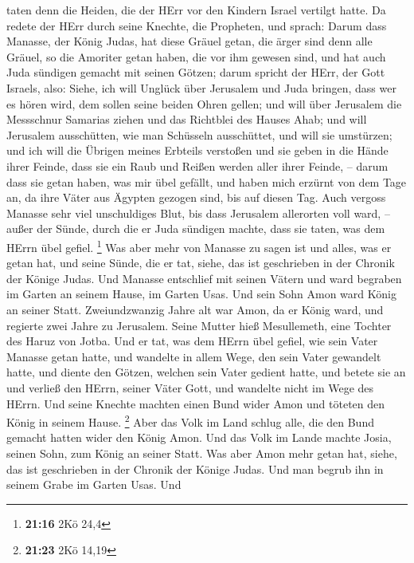 taten denn die Heiden, die der HErr vor den Kindern Israel vertilgt
hatte.  Da redete der HErr durch seine Knechte, die
Propheten, und sprach:  Darum dass Manasse, der König
Judas, hat diese Gräuel getan, die ärger sind denn alle Gräuel, so die
Amoriter getan haben, die vor ihm gewesen sind, und hat auch Juda
sündigen gemacht mit seinen Götzen;  darum spricht der
HErr, der Gott Israels, also: Siehe, ich will Unglück über Jerusalem und
Juda bringen, dass wer es hören wird, dem sollen seine beiden Ohren
gellen;  und will über Jerusalem die Messschnur Samarias
ziehen und das Richtblei des Hauses Ahab; und will Jerusalem
ausschütten, wie man Schüsseln ausschüttet, und will sie umstürzen;
 und ich will die Übrigen meines Erbteils verstoßen und sie
geben in die Hände ihrer Feinde, dass sie ein Raub und Reißen werden
aller ihrer Feinde, --  darum dass sie getan haben, was mir
übel gefällt, und haben mich erzürnt von dem Tage an, da ihre Väter aus
Ägypten gezogen sind, bis auf diesen Tag.  Auch vergoss
Manasse sehr viel unschuldiges Blut, bis dass Jerusalem allerorten voll
ward, -- außer der Sünde, durch die er Juda sündigen machte, dass sie
taten, was dem HErrn übel gefiel. \footnote{\textbf{21:16} 2Kö 24,4}
 Was aber mehr von Manasse zu sagen ist und alles, was er
getan hat, und seine Sünde, die er tat, siehe, das ist geschrieben in
der Chronik der Könige Judas.  Und Manasse entschlief mit
seinen Vätern und ward begraben im Garten an seinem Hause, im Garten
Usas. Und sein Sohn Amon ward König an seiner Statt. 
Zweiundzwanzig Jahre alt war Amon, da er König ward, und regierte zwei
Jahre zu Jerusalem. Seine Mutter hieß Mesullemeth, eine Tochter des
Haruz von Jotba.  Und er tat, was dem HErrn übel gefiel,
wie sein Vater Manasse getan hatte,  und wandelte in allem
Wege, den sein Vater gewandelt hatte, und diente den Götzen, welchen
sein Vater gedient hatte, und betete sie an  und verließ
den HErrn, seiner Väter Gott, und wandelte nicht im Wege des HErrn.
 Und seine Knechte machten einen Bund wider Amon und
töteten den König in seinem Hause. \footnote{\textbf{21:23} 2Kö 14,19}
 Aber das Volk im Land schlug alle, die den Bund gemacht
hatten wider den König Amon. Und das Volk im Lande machte Josia, seinen
Sohn, zum König an seiner Statt.  Was aber Amon mehr getan
hat, siehe, das ist geschrieben in der Chronik der Könige Judas.
 Und man begrub ihn in seinem Grabe im Garten Usas. Und
